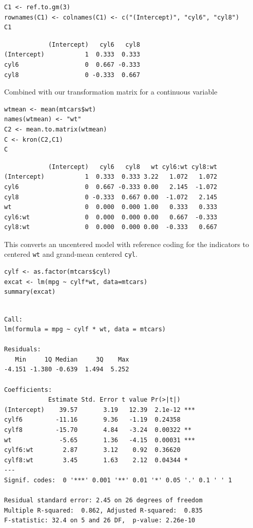 \documentclass[]{article}
\begin{document}
\begin{verbatim}
C1 <- ref.to.gm(3)
rownames(C1) <- colnames(C1) <- c("(Intercept)", "cyl6", "cyl8")
C1
\end{verbatim}

\begin{verbatim}
            (Intercept)   cyl6   cyl8
(Intercept)           1  0.333  0.333
cyl6                  0  0.667 -0.333
cyl8                  0 -0.333  0.667
\end{verbatim}

Combined with our transformation matrix for a continuous variable

\begin{verbatim}
wtmean <- mean(mtcars$wt)
names(wtmean) <- "wt"
C2 <- mean.to.matrix(wtmean)
C <- kron(C2,C1)
C
\end{verbatim}

\begin{verbatim}
            (Intercept)   cyl6   cyl8   wt cyl6:wt cyl8:wt
(Intercept)           1  0.333  0.333 3.22   1.072   1.072
cyl6                  0  0.667 -0.333 0.00   2.145  -1.072
cyl8                  0 -0.333  0.667 0.00  -1.072   2.145
wt                    0  0.000  0.000 1.00   0.333   0.333
cyl6:wt               0  0.000  0.000 0.00   0.667  -0.333
cyl8:wt               0  0.000  0.000 0.00  -0.333   0.667
\end{verbatim}

This converts an uncentered model with reference coding for the
indicators to centered \texttt{wt} and grand-mean centered \texttt{cyl}.

\begin{verbatim}
cylf <- as.factor(mtcars$cyl)
excat <- lm(mpg ~ cylf*wt, data=mtcars)
summary(excat)
\end{verbatim}

\begin{verbatim}

Call:
lm(formula = mpg ~ cylf * wt, data = mtcars)

Residuals:
   Min     1Q Median     3Q    Max 
-4.151 -1.380 -0.639  1.494  5.252 

Coefficients:
            Estimate Std. Error t value Pr(>|t|)    
(Intercept)    39.57       3.19   12.39  2.1e-12 ***
cylf6         -11.16       9.36   -1.19  0.24358    
cylf8         -15.70       4.84   -3.24  0.00322 ** 
wt             -5.65       1.36   -4.15  0.00031 ***
cylf6:wt        2.87       3.12    0.92  0.36620    
cylf8:wt        3.45       1.63    2.12  0.04344 *  
---
Signif. codes:  0 '***' 0.001 '**' 0.01 '*' 0.05 '.' 0.1 ' ' 1

Residual standard error: 2.45 on 26 degrees of freedom
Multiple R-squared:  0.862, Adjusted R-squared:  0.835 
F-statistic: 32.4 on 5 and 26 DF,  p-value: 2.26e-10
\end{verbatim}
\end{document}

